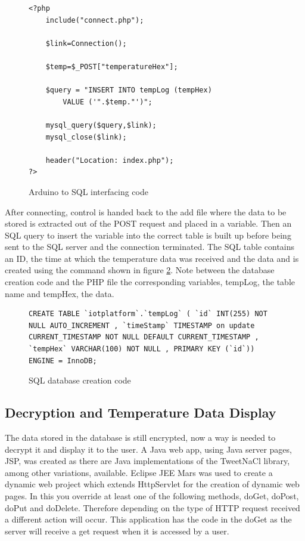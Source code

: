 \begin{figure}[H]
\begin{lstlisting}[style=PHP]
<?php
   	include("connect.php");
 
   	$link=Connection();
	
	$temp=$_POST["temperatureHex"];
 
	$query = "INSERT INTO tempLog (tempHex) 
		VALUE ('".$temp."')"; 
 
   	mysql_query($query,$link);
   	mysql_close($link);
 
   	header("Location: index.php");
?>
\end{lstlisting}
\caption{Arduino to SQL interfacing code}
\label{snip:php}
\end{figure}

After connecting, control is handed back to the add file where the data to be stored is extracted out of the POST request and placed in a variable. Then an SQL query to insert the variable into the correct table is built up before being sent to the SQL server and the connection terminated. The SQL table contains an ID, the time at which the temperature data was received and the data and is created using the command shown in figure \ref{snip:sql}. Note between the database creation code and the PHP file the corresponding variables, tempLog, the table name and tempHex, the data.

\begin{figure}[H]
\begin{lstlisting}[style=SQL]
CREATE TABLE `iotplatform`.`tempLog` ( `id` INT(255) NOT NULL AUTO_INCREMENT , `timeStamp` TIMESTAMP on update CURRENT_TIMESTAMP NOT NULL DEFAULT CURRENT_TIMESTAMP , `tempHex` VARCHAR(100) NOT NULL , PRIMARY KEY (`id`)) ENGINE = InnoDB;
\end{lstlisting}
\caption{SQL database creation code}
\label{snip:sql}
\end{figure}


\subsection{Decryption and Temperature Data Display}
\label{decryptemp}

The data stored in the database is still encrypted, now a way is needed to decrypt it and display it to the user. A Java web app, using Java server pages, JSP, was created as there are Java implementations of the TweetNaCl library, among other variations, available\cite{ian}. Eclipse JEE Mars was used to create a dynamic web project which extends HttpServlet for the creation of dynamic web pages. In this you override at least one of the following methods, doGet, doPost, doPut and doDelete. Therefore depending on the type of HTTP request received a different action will occur. This application has the code in the doGet as the server will receive a get request when it is accessed by a user.

